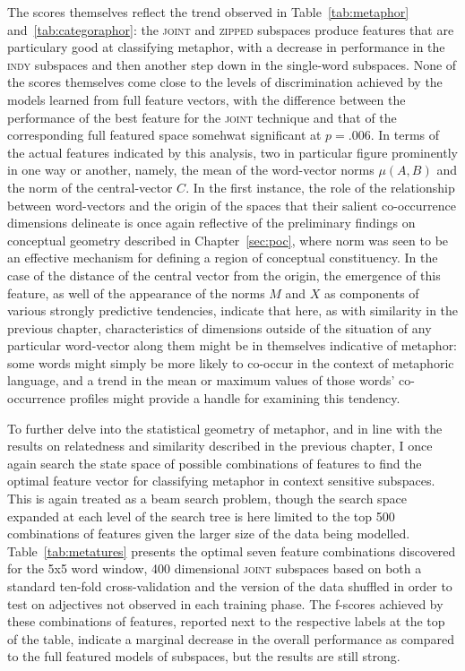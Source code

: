The scores themselves reflect the trend observed in Table~\ref{tab:metaphor} and~\ref{tab:categoraphor}: the \textsc{joint} and \textsc{zipped} subspaces produce features that are particulary good at classifying metaphor, with a decrease in performance in the \textsc{indy} subspaces and then another step down in the single-word subspaces.  None of the scores themselves come close to the levels of discrimination achieved by the models learned from full feature vectors, with the difference between the performance of the best feature for the \textsc{joint} technique and that of the corresponding full featured space somehwat significant at $p = .006$.  In terms of the actual features indicated by this analysis, two in particular figure prominently in one way or another, namely, the mean of the word-vector norms $\mu(A,B)$ and the norm of the central-vector $C$.  In the first instance, the role of the relationship between word-vectors and the origin of the spaces that their salient co-occurrence dimensions delineate is once again reflective of the preliminary findings on conceptual geometry described in Chapter~\ref{sec:poc}, where norm was seen to be an effective mechanism for defining a region of conceptual constituency.  In the case of the distance of the central vector from the origin, the emergence of this feature, as well of the appearance of the norms $M$ and $X$ as components of various strongly predictive tendencies, indicate that here, as with similarity in the previous chapter, characteristics of dimensions outside of the situation of any particular word-vector along them might be in themselves indicative of metaphor: some words might simply be more likely to co-occur in the context of metaphoric language, and a trend in the mean or maximum values of those words' co-occurrence profiles might provide a handle for examining this tendency.

To further delve into the statistical geometry of metaphor, and in line with the results on relatedness and similarity described in the previous chapter, I once again search the state space of possible combinations of features to find the optimal feature vector for classifying metaphor in context sensitive subspaces.  This is again treated as a beam search problem, though the search space expanded at each level of the search tree is here limited to the top 500 combinations of features given the larger size of the data being modelled.  Table~\ref{tab:metatures} presents the optimal seven feature combinations discovered for the 5x5 word window, 400 dimensional \textsc{joint} subspaces based on both a standard ten-fold cross-validation and the version of the data shuffled in order to test on adjectives not observed in each training phase.  The f-scores achieved by these combinations of features, reported next to the respective labels at the top of the table, indicate a marginal decrease in the overall performance as compared to the full featured models of subspaces, but the results are still strong.

